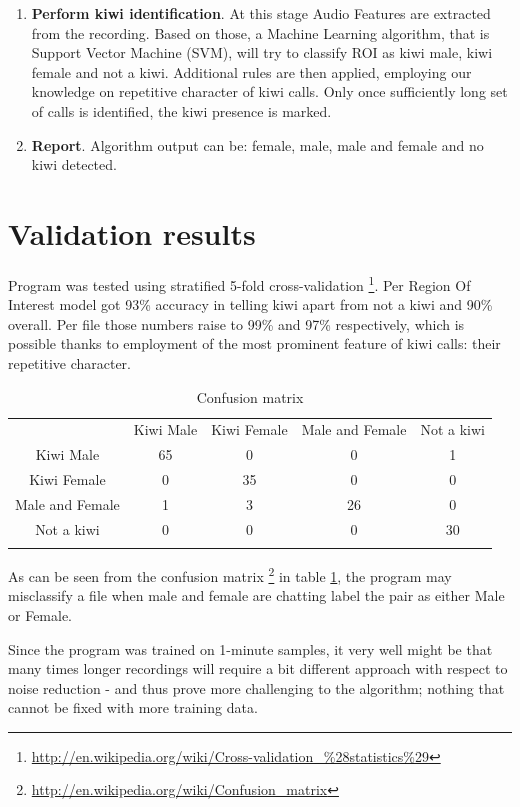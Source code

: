 \documentclass[paper=a4, fontsize=11pt]{scrartcl}	%
\numberwithin{equation}{section}		%
\numberwithin{figure}{section}			%
\numberwithin{table}{section}				%
\begin{document}
\begin{enumerate}
	\item \textbf{Perform kiwi identification}. At this stage Audio Features are extracted from the recording. Based on those, a Machine Learning algorithm, that is Support Vector Machine (SVM), will try to classify ROI as kiwi male, kiwi female and not a kiwi. Additional rules are then applied, employing our knowledge on repetitive character of kiwi calls. Only once sufficiently long set of calls is identified, the kiwi presence is marked. 
	\item \textbf{Report}. Algorithm output can be: female, male, male and female and no kiwi detected.
\end{enumerate}

\section{Validation results}
Program was tested using stratified 5-fold cross-validation \footnote{\url{http://en.wikipedia.org/wiki/Cross-validation_\%28statistics\%29}}. Per Region Of Interest model got 93\% accuracy in telling kiwi apart from not a kiwi and 90\% overall. Per file those numbers raise to 99\% and 97\% respectively, which is possible thanks to employment of the most prominent feature of kiwi calls: their repetitive character. 

\begin{table}[hp]
\label{tab:confusion}
\caption{Confusion matrix}
\begin{tabularx}{.7\textwidth}{c|c c c c |}
 & Kiwi Male & Kiwi Female & Male and Female & \multicolumn{1}{c}{Not a kiwi} \\
\hhline{-----}
Kiwi Male & 65 \cellcolor[gray]{.8}& 0 & 0 & 1 \\
Kiwi Female & 0 & 35 \cellcolor[gray]{.8}& 0 & 0 \\
Male and Female & 1 & 3 & 26 \cellcolor[gray]{.8} & 0 \\
Not a kiwi & 0 & 0 & 0 & 30 \cellcolor[gray]{.8} \\
\hhline{~----}
\end{tabularx}
\end{table}

As can be seen from the confusion matrix \footnote{\url{http://en.wikipedia.org/wiki/Confusion_matrix}} in table \ref{tab:confusion}, the program may misclassify a file when male and female are chatting label the pair as either Male or Female.

Since the program was trained on 1-minute samples, it very well might be that many times longer recordings will require a bit different approach with respect to noise reduction - and thus prove more challenging to the algorithm; nothing that cannot be fixed with more training data.
\end{document}
